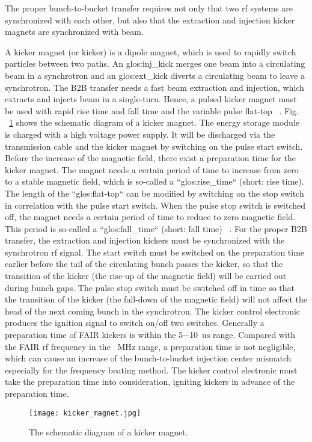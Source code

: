 The proper bunch-to-bucket transfer requires not only that two rf systems are synchronized with each other, but also that the extraction and injection kicker magnets are synchronized with beam.

A kicker magnet (or kicker) is a dipole magnet, which is used to rapidly switch particles between two paths. An \gls{glos:inj_kick} merges one beam into a circulating beam in a synchrotron and an \gls{glos:ext_kick} diverts a circulating beam to leave a synchrotron. The B2B transfer needs a fast beam extraction and injection, which extracts and injects beam in a single-turn. Hence, a pulsed kicker magnet must be used with rapid rise time and fall time and the variable pulse flat-top ~\cite{petzenhauser_concept_2016}. Fig. ~\ref{kicker_magnet} shows the schematic diagram of a kicker magnet. The energy storage module is charged with a high voltage power supply. It will be discharged via the transmission cable and the kicker magnet by switching on the pulse start switch. Before the increase of the magnetic field, there exist a preparation time for the kicker magnet. The magnet needs a certain period of time to increase from zero to a stable magnetic field, which is so-called a ``\gls{glos:rise_time}`` (short: rise time). The length of the ``\gls{glos:flat-top}`` can be modified by switching on the stop switch in correlation with the pulse start switch. When the pulse stop switch is switched off, the magnet needs a certain period of time to reduce to zero magnetic field. This period is so-called a ``\gls{glos:fall_time}`` (short: fall time) ~\cite{udo_injection_2014}. For the proper B2B transfer, the extraction and injection kickers must be synchronized with the synchrotron rf signal. The start switch must be switched on the preparation time earlier before the tail of the circulating bunch passes the kicker, so that the transition of the kicker (the rise-up of the magnetic field) will be carried out during bunch gaps. The pulse stop switch must be switched off in time so that the transition of the kicker (the fall-down of the magnetic field) will not affect the head of the next coming bunch in the synchrotron. The kicker control electronic produces the ignition signal to switch on/off two switches. Generally a preparation time of FAIR kickers is within the \SI{5}{}$-$\SI{10}{us} range. Compared with the FAIR rf frequency in the \SI{}{MHz} range, a preparation time is not negligible, which can cause an increase of the bunch-to-bucket injection center mismatch especially for the frequency beating method. The kicker control electronic must take the preparation time into consideration, igniting kickers in advance of the preparation time.
\begin{figure}[!htb]
   \centering   
   \texttt{[image: kicker\_magnet.jpg]}
   \caption{The schematic diagram of a kicker magnet.}
   \label{kicker_magnet}
\end{figure}
 
